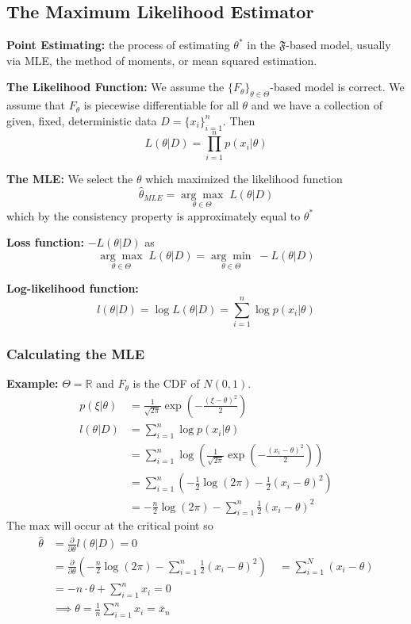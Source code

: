 \documentclass[12pt]{article}
\renewcommand{\hat}[1]{\widehat{#1}}
\newcommand{\R}{\mathbb{R}}
\begin{document}
\subsection{The Maximum Likelihood Estimator}
\textbf{Point Estimating:} the process of estimating $\theta^*$ in the $\mathfrak{F}$-based model, usually via MLE, the method of moments, or mean squared estimation. 

\textbf{The Likelihood Function:} We assume the $\{F_\theta\}_{\theta \in \Theta}$-based model is correct. We assume that $F_\theta$ is piecewise differentiable for all $\theta$ and we have a collection of given, fixed, deterministic data $D = \{x_i\}_{i=1}^n$. Then 
\[L(\theta | D) = \prod_{i=1}^n p(x_i | \theta)\]

\textbf{The MLE:} We select the $\theta$ which maximized the likelihood function 
\[\hat \theta_{MLE} = \underset{\theta \in \Theta}{\arg \max} \; L(\theta | D)\]
which by the consistency property is approximately equal to $\theta^*$

\textbf{Loss function:} $-L(\theta | D)$ as 
\[\underset{\theta \in \Theta}{\arg \max} \; L(\theta | D) = \underset{\theta \in \Theta}{\arg \min} \; -L(\theta | D)\]

\textbf{Log-likelihood function:}
\[l(\theta  | D) = \log L(\theta | D) = \sum_{i=1}^n \log p(x_i | \theta)\]

\subsubsection*{Calculating the MLE}
\textbf{Example:} $\Theta = \R$ and $F_{\theta}$ is the CDF of $N(0,1)$. 
\begin{align*}
    p(\xi | \theta) &=\frac{1}{\sqrt{2\pi}} \exp(-\frac{(\xi - \theta)^2}{2})\\
    l(\theta | D) &= \sum_{i=1}^n \log p(x_i | \theta)\\
    &= \sum_{i=1}^n \log\left(\frac{1}{\sqrt{2\pi}} \exp(-\frac{(x_i - \theta)^2}{2})\right)\\
    &= \sum_{i=1}^n \left(-\frac{1}{2}\log(2\pi) - \frac{1}{2}(x_i - \theta)^2\right)\\
    &= -\frac{n}{2}\log(2\pi) - \sum_{i=1}^n \frac{1}{2}(x_i - \theta)^2
\end{align*}
The max will occur at the critical point so 
\begin{align*}
    \hat \theta &= \frac{\partial}{\partial \theta} l(\theta | D) = 0\\
    &= \frac{\partial}{\partial \theta} \left(-\frac{n}{2}\log(2\pi) - \sum_{i=1}^n \frac{1}{2}(x_i - \theta)^2\right)\
    &= \sum_{i=1}^N (x_i - \theta)\\
    &= -n \cdot \theta + \sum_{i=1}^n x_i = 0\\
    &\implies \theta = \frac{1}{n} \sum_{i=1}^n x_i = \overline{x}_n
\end{align*}
\end{document}
